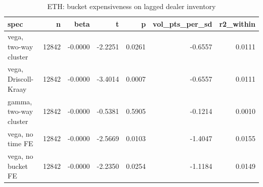 \begin{table}
\caption{ETH: bucket expensiveness on lagged dealer inventory}
\label{tab:t4_cross_section_ETH}
\begin{tabular}{lrrrrrr}
\toprule
spec & n & beta & t & p & vol\_pts\_per\_sd & r2\_within \\
\midrule
vega, two-way cluster & 12842 & -0.0000 & -2.2251 & 0.0261 & -0.6557 & 0.0111 \\
vega, Driscoll-Kraay & 12842 & -0.0000 & -3.4014 & 0.0007 & -0.6557 & 0.0111 \\
gamma, two-way cluster & 12842 & -0.0000 & -0.5381 & 0.5905 & -0.1214 & 0.0010 \\
vega, no time FE & 12842 & -0.0000 & -2.5669 & 0.0103 & -1.4047 & 0.0155 \\
vega, no bucket FE & 12842 & -0.0000 & -2.2350 & 0.0254 & -1.1184 & 0.0149 \\
\bottomrule
\end{tabular}
\end{table}
